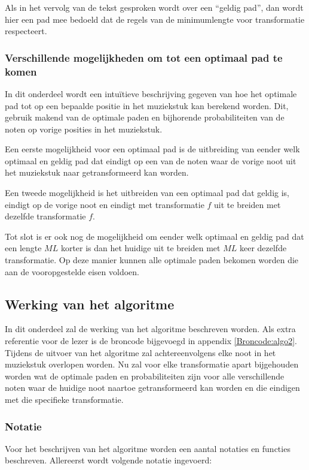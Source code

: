 Als in het vervolg van de tekst gesproken wordt over een ``geldig pad'', dan wordt hier een pad mee bedoeld dat de regels van de minimumlengte voor transformatie respecteert.

\subsubsection{Verschillende mogelijkheden om tot een optimaal pad te komen} 
In dit onderdeel wordt een intu\"itieve beschrijving gegeven van hoe het optimale pad tot op een bepaalde positie in het muziekstuk kan berekend worden. Dit, gebruik makend van de optimale paden en bijhorende probabiliteiten van de noten op vorige posities in het muziekstuk.

Een eerste mogelijkheid voor een optimaal pad is de uitbreiding van eender welk optimaal en geldig pad dat eindigt op een van de noten waar de vorige noot uit het muziekstuk naar getransformeerd kan worden.
 
Een tweede mogelijkheid is het uitbreiden van een optimaal pad dat geldig is, eindigt op de vorige noot en eindigt met transformatie $f$ uit te breiden met dezelfde transformatie $f$.
 
Tot slot is er ook nog de mogelijkheid om eender welk optimaal en geldig pad dat een lengte $ML$ korter is dan het huidige uit te breiden met $ML$ keer dezelfde transformatie. Op deze manier kunnen alle optimale paden bekomen worden die aan de vooropgestelde eisen voldoen.

\subsection{Werking van het algoritme}
\label{ETT:werking}
In dit onderdeel zal de werking van het algoritme beschreven worden. Als extra referentie voor de lezer is de broncode bijgevoegd in appendix \ref{Broncode:algo2}. Tijdens de uitvoer van het algoritme zal achtereenvolgens elke noot in het muziekstuk overlopen worden. Nu zal voor elke transformatie apart bijgehouden worden wat de optimale paden en probabiliteiten zijn voor alle verschillende noten waar de huidige noot naartoe getransformeerd kan worden en die eindigen met die specifieke transformatie. 

\subsubsection{Notatie}
Voor het beschrijven van het algoritme worden een aantal notaties en functies beschreven. Allereerst wordt volgende notatie ingevoerd:

